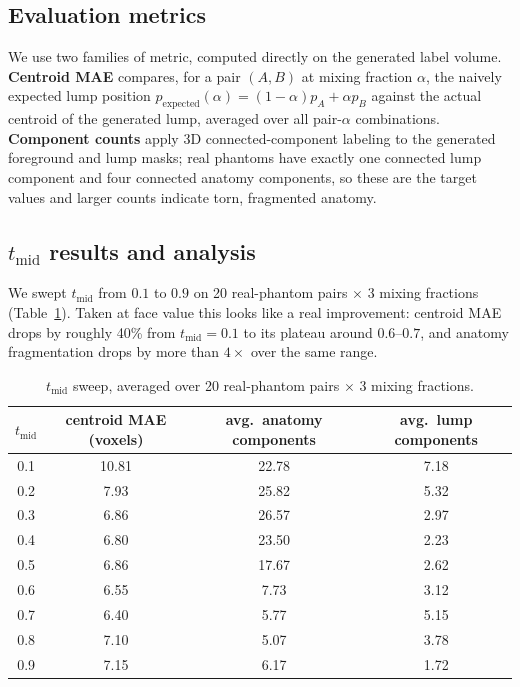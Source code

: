 \documentclass[11pt]{article}
\begin{document}
\subsection{Evaluation metrics}
We use two families of metric, computed directly on the generated label volume. \textbf{Centroid
MAE} compares, for a pair $(A,B)$ at mixing fraction $\alpha$, the naively expected lump position
$p_{\text{expected}}(\alpha) = (1-\alpha)p_A + \alpha p_B$ against the actual centroid of the
generated lump, averaged over all pair-$\alpha$ combinations. \textbf{Component counts} apply 3D
connected-component labeling to the generated foreground and lump masks; real phantoms have
exactly one connected lump component and four connected anatomy components, so these are the
target values and larger counts indicate torn, fragmented anatomy.

\subsection{$t_{\text{mid}}$ results and analysis}
We swept $t_{\text{mid}}$ from $0.1$ to $0.9$ on 20 real-phantom pairs $\times$ 3 mixing
fractions (Table~\ref{tab:tmid}). Taken at face value this looks like a real improvement:
centroid MAE drops by roughly 40\% from $t_{\text{mid}}=0.1$ to its plateau around
$0.6$--$0.7$, and anatomy fragmentation drops by more than $4\times$ over the same range.

\begin{table}[H]
\centering
\begin{tabular}{c c c c}
\toprule
$t_{\text{mid}}$ & centroid MAE (voxels) & avg.\ anatomy components & avg.\ lump components \\
\midrule
0.1 & 10.81 & 22.78 & 7.18 \\
0.2 & 7.93  & 25.82 & 5.32 \\
0.3 & 6.86  & 26.57 & 2.97 \\
0.4 & 6.80  & 23.50 & 2.23 \\
0.5 & 6.86  & 17.67 & 2.62 \\
0.6 & 6.55  & 7.73  & 3.12 \\
0.7 & 6.40  & 5.77  & 5.15 \\
0.8 & 7.10  & 5.07  & 3.78 \\
0.9 & 7.15  & 6.17  & 1.72 \\
\bottomrule
\end{tabular}
\caption{$t_{\text{mid}}$ sweep, averaged over 20 real-phantom pairs $\times$ 3 mixing
fractions.}
\label{tab:tmid}
\end{table}
\end{document}
